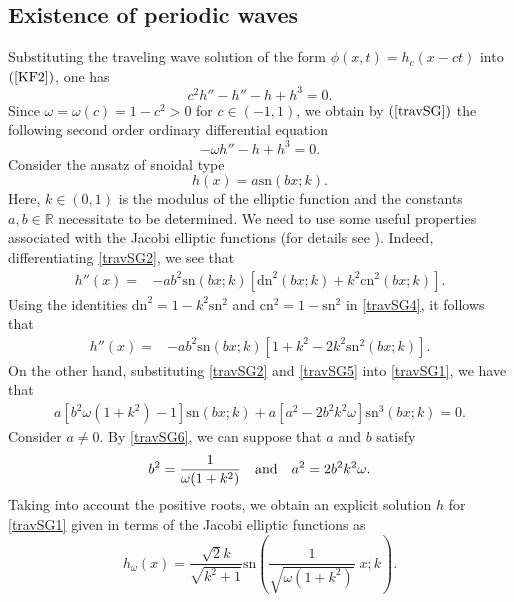 \documentclass[12pt,reqno,a4paper]{amsart} %
\numberwithin{equation}{section}
\numberwithin{figure}{section}
\begin{document}
\subsection{Existence of periodic waves}

Substituting the traveling wave
solution of the form $\phi(x,t)=h_c(x-ct)$ into $(\ref{KF2})$, one has
\begin{equation}
c^2h''-h''-h+h^3=0.
\label{travSG}\end{equation} Since $\omega=\omega(c)=1-c^2>0$ for $c\in (-1,1)$, we
obtain by $(\ref{travSG})$ the following second order ordinary differential equation
\begin{equation}\label{travSG1}
-\omega h''-h+h^3=0.
\end{equation}
\indent Consider the ansatz of snoidal type
\begin{equation}
h(x)=a\mbox{sn}\left(bx;k\right).
	\label{travSG2}\end{equation} 
Here, $k\in (0,1)$ is the modulus of the elliptic function and the constants $a,b\in \mathbb{R}$ necessitate to be determined. We need to use some useful properties associated with the Jacobi elliptic functions (for details see \cite{byrd}). Indeed, differentiating \eqref{travSG2}, we see that
\begin{align} 	\label{travSG4}
	h''(x)=&-ab^2\mbox{sn}\left(bx;k\right)[\mbox{dn}^2\left(bx;k\right)+k^2\mbox{cn}^2\left(bx;k\right)] . \end{align} 
 Using the identities $\mbox{dn}^2=1-k^2\mbox{sn}^2$ and $\mbox{cn}^2=1-\mbox{sn}^2$ in \eqref{travSG4}, it follows that
 \begin{align} \label{travSG5}
 	h''(x)=&-ab^2\mbox{sn}\left(bx;k\right)[1+k^2-2k^2\mbox{sn}^2\left(bx;k\right)] . \end{align} 
 \indent On the other hand, substituting \eqref{travSG2} and \eqref{travSG5} into \eqref{travSG1}, we have that
  \begin{align} \label{travSG6}
a [b^2\omega(1+k^2)-1]\mbox{sn}\left(bx;k\right)+a[a^2-2b^2k^2\omega ] \mbox{sn}^3\left(bx;k\right)=0. \end{align} 
Consider $a\neq 0$. By \eqref{travSG6}, we can suppose that $a$ and $b$ satisfy
 \begin{align} \label{travSG7}
 b^2 =\frac{1}{\omega(1+k^2)} \quad  {\rm and} \quad  a^2=2b^2k^2\omega . \end{align}Taking into account the positive roots, we obtain an explicit solution $h$ for \eqref{travSG1} given in terms of the Jacobi elliptic functions as
\begin{equation}
	h_\omega(x)=\frac{\sqrt{2}k}{\sqrt{k^2+1} }\mbox{sn}\left(\frac{1}{\sqrt{\omega(1+k^2)}}\; x;k\right).
	\label{travSG8}\end{equation} 
\end{document}
